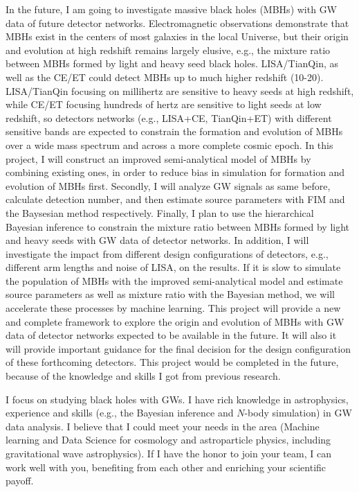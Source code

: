 \documentclass[12pt,a4paper,sans]{article}%
\begin{document}
In the future, I am going to investigate massive black holes (MBHs) with GW data of future detector networks. Electromagnetic
observations demonstrate that MBHs exist in the centers of most
galaxies in the local Universe, but their origin and evolution at high redshift remains largely
elusive, e.g., the mixture ratio between MBHs formed by light and heavy seed black holes. LISA/TianQin, as well as the
CE/ET could detect MBHs up to much higher
redshift (10-20). LISA/TianQin focusing on millihertz are sensitive to heavy seeds at high redshift, while CE/ET focusing
hundreds of hertz are sensitive to light seeds at low redshift, so detectors networks (e.g., LISA+CE, TianQin+ET) with different sensitive bands are expected to
constrain the formation and evolution of MBHs over a wide mass spectrum and across a more complete cosmic
epoch. In this project, I will construct an improved semi-analytical model of MBHs by combining
existing ones, in order to reduce bias in simulation for formation and evolution of MBHs first.
Secondly, I will analyze GW signals as same before, calculate detection number, and then estimate source parameters
with FIM and the
Baysesian method respectively. Finally, I plan to use the hierarchical Bayesian inference to constrain the mixture ratio
between MBHs formed by light and heavy seeds with GW data of detector networks. In addition, I will investigate the impact from different design configurations of
detectors, e.g., different arm lengths and noise of LISA, on the results. If it is slow to simulate the population of
MBHs with the improved
semi-analytical model and estimate source parameters as well as mixture ratio with the Bayesian method, we will
accelerate these processes by machine learning. This project will provide a new and complete framework to explore the
origin and evolution of MBHs with GW data of detector networks expected to be
available in the future. It will also it will provide important guidance for the final decision for the design
configuration of these forthcoming detectors. This project would be completed in the future, because of the knowledge
and skills I got from previous research.

I focus on studying black holes with GWs. I have rich knowledge in astrophysics, experience and skills (e.g., the Bayesian
inference and $N$-body simulation) in GW
data analysis. I believe that I could meet your needs in the area (Machine learning and Data Science for cosmology and astroparticle
physics, including gravitational wave astrophysics). If I have the honor to join your team, I can work well with you, benefiting from each
other and enriching your scientific payoff. 
\end{document}
